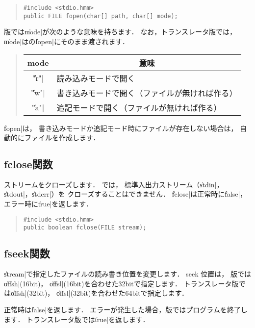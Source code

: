 \begin{quote}
\begin{verbatim}
#include <stdio.hmm>
public FILE fopen(char[] path, char[] mode);
\end{verbatim}
\end{quote}

{\tacos}版では\|mode|が次のような意味を持ちます．
なお，トランスレータ版では，\|mode|は{\cl}の\|fopen|にそのまま渡されます．

\begin{quote}
\begin{tabular}{c|l}
\multicolumn{1}{c|}{mode} & \multicolumn{1}{c}{意味} \\\hline
\|"r"| & 読み込みモードで開く \\
\|"w"| & 書き込みモードで開く（ファイルが無ければ作る） \\
\|"a"| & 追記モードで開く（ファイルが無ければ作る）
\end{tabular}
\end{quote}

\|fopen|は，
書き込みモードか追記モード時にファイルが存在しない場合は，
自動的にファイルを作成します．

\subsection{fclose関数}

ストリームをクローズします．
\tacos では，
標準入出力ストリーム（\|stdin|，\|stdout|，\|stderr|）を
クローズすることはできません．
\|fclose|は正常時に\|false|，
エラー時に\|true|を返します．

\begin{quote}
\begin{verbatim}
#include <stdio.hmm>
public boolean fclose(FILE stream);
\end{verbatim}
\end{quote}

\subsection{fseek関数}

\|stream|で指定したファイルの読み書き位置を変更します．
seek 位置は，
{\tacos}版では\|offsh|(16bit)，
\|offsl|(16bit)を合わせた32bitで指定します．
トランスレータ版では\|offsh|(32bit)，
\|offsl|(32bit)を合わせた64bitで指定します．

正常時は\|false|を返します．
エラーが発生した場合，{\tacos}版ではプログラムを終了します．
トランスレータ版では\|true|を返します．

